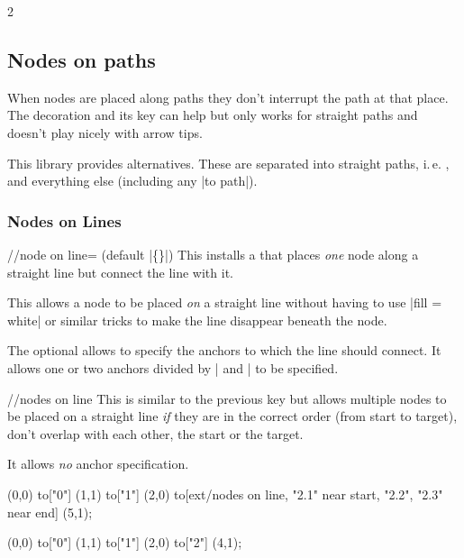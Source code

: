 \begin{multicols*}{2}
\subsection{Nodes on paths}
When nodes are placed along paths they don't interrupt
the path at that place.
The decoration 
and its 
key can help but only works for straight paths and
doesn't play nicely with arrow tips.

This library provides alternatives.
These are separated into straight paths, i.\,e. ,
and everything else (including any |to path|).

\subsubsection{Nodes on Lines}

\begin{stylekey}{/\tikzext/node on line= (default |\{\}|)}
This installs a  that places \emph{one}
node along a straight line but connect the line with it.

This allows a node to be placed \emph{on} a straight line without having to
use |fill = white| or similar tricks to make the line disappear 
beneath the node.

The optional  allows to specify the
anchors to which the line should connect.
It allows one or two anchors divided by | and | to be specified.
\end{stylekey}

\begin{stylekey}{/\tikzext/nodes on line}
This is similar to the previous key but allows
multiple nodes to be placed on a straight line
\emph{if} they are in the correct order (from start to target),
don't overlap with each other, the start or the target.

It allows \emph{no} anchor specification.
\end{stylekey}

\begin{codeexample}[preamble=\usetikzlibrary{ext.nodes, quotes}]
\tikz[inner sep=.15em, circle, nodes=draw, sloped]
   (0,0) to["0"] (1,1)
                                                 to["1"] (2,0)
    to[ext/nodes on line, "2.1" near start, "2.2", "2.3" near end] (5,1);
\end{codeexample}
\begin{codeexample}[preamble=\usetikzlibrary{ext.nodes, quotes}]
\tikz[inner sep=.15em, nodes=draw]
  \draw[thick, ->, ext/node on line=west and east]
     (0,0) to["0"] (1,1)
           to["1"] (2,0)
           to["2"] (4,1);
\end{codeexample}


\end{multicols*}

